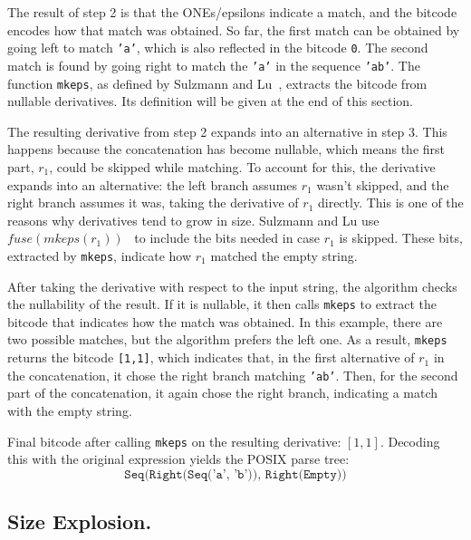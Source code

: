 \documentclass[12pt]{article}
\begin{document}
The result of step 2 is that the ONEs/epsilons indicate a match, and the bitcode encodes how that match was obtained. So far, 
the first match can be obtained by going left to match \texttt{'a'}, which is also reflected in the bitcode \texttt{0}. 
The second match is found by going right to match the \texttt{'a'} in the sequence \texttt{'ab'}. The function \texttt{mkeps},
as defined by Sulzmann and Lu~\cite{Sulzmann2014}, extracts the bitcode from nullable derivatives. Its definition will be given
at the end of this section.


The resulting derivative from step 2 expands into an alternative in step 3. This happens because the concatenation has become 
nullable, which means the first part, $ r_1 $, could be skipped while matching. To account for this, the derivative expands into
an alternative: the left branch assumes $ r_1 $ wasn’t skipped, and the right branch assumes it was, taking the derivative of 
$ r_1 $ directly. This is one of the reasons why derivatives tend to grow in size. Sulzmann and Lu use $fuse(mkeps(r_1))$~\cite{Sulzmann2014} 
to include the bits needed in case \( r_1 \) is skipped. These bits, extracted by \texttt{mkeps}, indicate how \( r_1 \) matched the empty string.

    
After taking the derivative with respect to the input string, the algorithm checks the nullability of the result. If it is nullable,
it then calls \texttt{mkeps} to extract the bitcode that indicates how the match was obtained. In this example, there are two possible
matches, but the algorithm prefers the left one. As a result, \texttt{mkeps} returns the bitcode \texttt{[1,1]}, which indicates that,
in the first alternative of $r_1$ in the concatenation, it chose the right branch matching \texttt{'ab'}. Then, for the second part of
the concatenation, it again chose the right branch, indicating a match with the empty string.

Final bitcode after calling \texttt{mkeps} on the resulting derivative: \([1, 1]\). Decoding this with the original expression yields 
the POSIX parse tree:
\[
\texttt{Seq(Right(Seq('a', 'b')), Right(Empty))}
\]
\subsection{Size Explosion.} %
\end{document}
